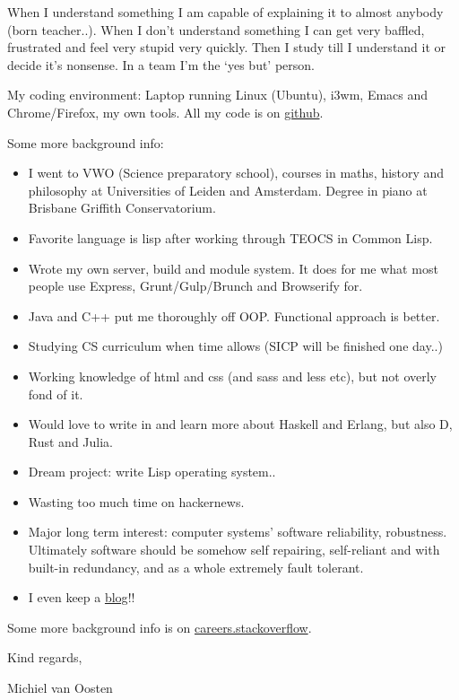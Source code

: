 When I understand something I am capable of explaining it to almost anybody (born teacher..). When I don't understand something I can get very baffled, frustrated and feel very stupid very quickly. Then I study till I understand it or decide it's nonsense. In a team I'm the `yes but' person.

My coding environment: Laptop running Linux (Ubuntu), i3wm, Emacs and Chrome/Firefox, my own tools. All my code is on \href{http://github.com/michieljoris}{github}.

Some more background info:

\begin{itemize}
\item I went to VWO (Science preparatory school), courses in maths, history and philosophy at Universities of Leiden and Amsterdam. Degree in piano at Brisbane Griffith Conservatorium.
\item Favorite language is lisp after working through TEOCS in Common Lisp.
\item Wrote my own server, build and module system. It does for me what most people use Express, Grunt/Gulp/Brunch and Browserify for.
\item Java and C++ put me thoroughly off OOP. Functional approach is better.
\item Studying CS curriculum when time allows (SICP will be finished one day..)
\item Working knowledge of html and css (and sass and less etc), but not overly fond of it.
\item Would love to write in and learn more about Haskell and Erlang, but also D, Rust and Julia.
\item Dream project: write Lisp operating system..
\item Wasting too much time on hackernews.
\item Major long term interest: computer systems' software reliability, robustness. Ultimately
  software should be somehow self repairing, self-reliant and with built-in
  redundancy, and as a whole extremely fault tolerant.
\item I even keep a \href{http://www.axion5.net}{blog}!!
\end{itemize}
  
Some more background info is on \href{http://careers.stackoverflow.com/michieljoris}{careers.stackoverflow}.

Kind regards,

Michiel van Oosten

